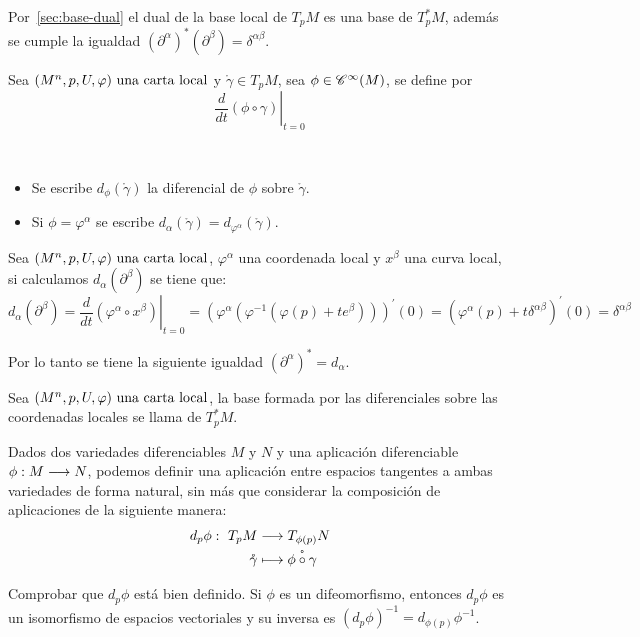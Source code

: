 Por~\ref{sec:base-dual} el dual de la base local de $T_p M$ es una base de $T^*_p M$, además se cumple la igualdad $
(\partial^\alpha)^*(\partial^\beta)=\delta^{\alpha\beta}$.

\begin{definition}
  Sea $(M^n,p,U,\varphi)\textmd{ una carta local}$ y $\mathring{\gamma}\in T_p M$, sea $\phi\in\mathscr{C}^\infty(M)$, se define  por
  \begin{equation}
    \label{eq:diferencial-funcion-punto}
    \left.\frac{d}{dt}(\phi\circ\gamma)\right|_{t=0}
  \end{equation}
\end{definition}
\begin{notation}
  \
  \begin{itemize}
    \item Se escribe $d_{\phi}(\mathring{\gamma})$ la diferencial de $\phi$ sobre $\mathring{\gamma}$.
    \item Si $\phi=\varphi^\alpha$ se escribe $d_\alpha(\mathring{\gamma})=d_{\varphi^\alpha}(\mathring{\gamma})$.
  \end{itemize}
\end{notation}

Sea $(M^n,p,U,\varphi)\textmd{ una carta local}$, $\varphi^\alpha$ una coordenada local y $x^\beta$ una curva local, si calculamos $d_{\alpha}
(\partial^\beta)$ se tiene que:
\[
  d_{\alpha}(\partial^\beta)=\left.\frac{d}{dt}(\varphi^\alpha\circ x^\beta)\right|_{t=0}=
  (\varphi^\alpha(\varphi^{-1}(\varphi(p)+te^\beta)))^{'}(0)=(\varphi^\alpha(p)
  +t\delta^{\alpha\beta})^{'}(0)=\delta^{\alpha\beta}
\]

Por lo tanto se tiene la siguiente igualdad $(\partial^\alpha)^*=d_\alpha$.

\begin{definition}
  Sea $(M^n,p,U,\varphi)\textmd{ una carta local}$, la base formada por las diferenciales sobre
  las coordenadas locales se llama  de
  $T^*_p M$.
\end{definition}

Dados dos variedades diferenciables $M$ y $N$ y una aplicación diferenciable $\phi:M\longrightarrow N$,
podemos definir una aplicación entre espacios tangentes a ambas variedades de forma natural, sin
más que considerar la composición de aplicaciones de la siguiente manera:
\begin{equation}
  \label{eq:diferencial-aplicacion}
  \begin{alignedat}{1}
    d_p\phi:\ T_pM & \longrightarrow T_{\phi(p)}N \\ \mathring{\gamma} & \longmapsto \mathring{\phi\circ\gamma}
  \end{alignedat}
\end{equation}

\begin{exercise}
  Comprobar que $d_p\phi$ está bien definido.
  Si $\phi$ es un difeomorfismo, entonces $d_p\phi$ es
  un isomorfismo de espacios vectoriales y su inversa es $(d_p\phi)^{-1}=d_{\phi(p)}\phi^{-1}$.
\end{exercise}
